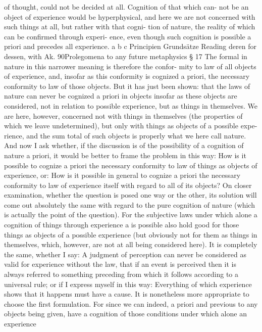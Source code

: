 of thought, could not be decided at all. Cognition of that which can-
not be an object of experience would be hyperphysical, and here we
are not concerned with such things at all, but rather with that cogni-
tion of nature, the reality of which can be conﬁrmed through experi-
ence, even though such cognition is possible a priori and precedes all
experience.
a
b
c
Principien
Grundsätze
Reading deren for dessen, with Ak.
90Prolegomena to any future metaphysics
§ 17
The formal in nature in this narrower meaning is therefore the confor-
mity to law of all objects of experience, and, insofar as this conformity
is cognized a priori, the necessary conformity to law of those objects. But
it has just been shown: that the laws of nature can never be cognized a
priori in objects insofar as these objects are considered, not in relation to
possible experience, but as things in themselves. We are here, however,
concerned not with things in themselves (the properties of which we
leave undetermined), but only with things as objects of a possible expe-
rience, and the sum total of such objects is properly what we here call
nature. And now I ask whether, if the discussion is of the possibility of a
cognition of nature a priori, it would be better to frame the problem in
this way: How is it possible to cognize a priori the necessary conformity
to law of things as objects of experience, or: How is it possible in general
to cognize a priori the necessary conformity to law of experience itself with
regard to all of its objects?
On closer examination, whether the question is posed one way or the
other, its solution will come out absolutely the same with regard to the
pure cognition of nature (which is actually the point of the question).
For the subjective laws under which alone a cognition of things through
experience a is possible also hold good for those things as objects of a
possible experience (but obviously not for them as things in themselves,
which, however, are not at all being considered here). It is completely the
same, whether I say: A judgment of perception can never be considered as
valid for experience without the law, that if an event is perceived then it is
always referred to something preceding from which it follows according
to a universal rule; or if I express myself in this way: Everything of which
experience shows that it happens must have a cause.
It is nonetheless more appropriate to choose the ﬁrst formulation.
For since we can indeed, a priori and previous to any objects being given,
have a cognition of those conditions under which alone an experience
